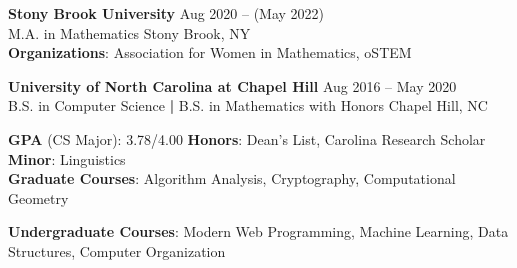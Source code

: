 \textbf{Stony Brook University} \hfill {\small Aug 2020 -- (May 2022)}
\\
M.A. in Mathematics \hfill {\small Stony Brook, NY} \\
{\small \textbf{Organizations}: Association for Women in Mathematics, oSTEM}
\vspace{2mm}

\textbf{University of North Carolina at Chapel Hill} \hfill {\small Aug 2016 -- May 2020}
\\
B.S. in Computer Science \textbf{|} B.S. in Mathematics with Honors \hfill {\small Chapel Hill, NC}
\\

\vspace{1mm}

{\small \textbf{GPA} (CS Major): 3.78/4.00 \hspace{10mm} \textbf{Honors}: Dean's List, Carolina Research Scholar \hspace{10mm} \textbf{Minor}: Linguistics \\

\textbf{Graduate Courses}: Algorithm Analysis, Cryptography, Computational Geometry \\

\vspace{-0.5mm}

\textbf{Undergraduate Courses}: Modern Web Programming, Machine Learning, Data Structures, Computer Organization}

